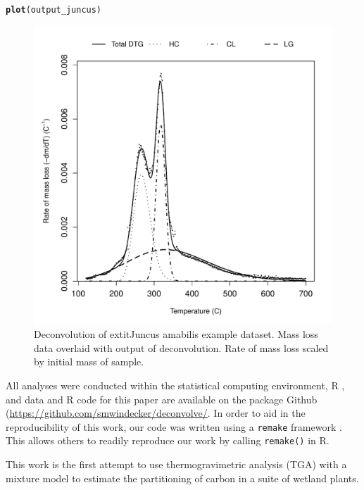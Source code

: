 \documentclass{jors}\usepackage[]{graphicx}\usepackage[]{color}
\makeatletter
\def\maxwidth{ %
  \ifdim\Gin@nat@width>\linewidth
    \linewidth
  \else
    \Gin@nat@width
  \fi
}
\newcommand{\hlstd}[1]{\textcolor[rgb]{0.345,0.345,0.345}{#1}}%
\newcommand{\hlkwd}[1]{\textcolor[rgb]{0.737,0.353,0.396}{\textbf{#1}}}%
\newenvironment{kframe}{%
 \def\at@end@of@kframe{}%
 \ifinner\ifhmode%
  \def\at@end@of@kframe{\end{minipage}}%
  \begin{minipage}{\columnwidth}%
 \fi\fi%
 \def\FrameCommand##1{\hskip\@totalleftmargin \hskip-\fboxsep
 \colorbox{shadecolor}{##1}\hskip-\fboxsep
     \hskip-\linewidth \hskip-\@totalleftmargin \hskip\columnwidth}%
 \MakeFramed {\advance\hsize-\width
   \@totalleftmargin\z@ \linewidth\hsize
   \@setminipage}}%
 {\par\unskip\endMakeFramed%
 \at@end@of@kframe}
\newenvironment{knitrout}{}{} %
\makeatother
\begin{document}
\begin{knitrout}\footnotesize
{}\color{fgcolor}\begin{kframe}
\begin{alltt}
\hlkwd{plot}\hlstd{(output_juncus)}
\end{alltt}
\end{kframe}\begin{figure}[H]
\includegraphics[width=\maxwidth]{figure/unnamed-chunk-14-1} \caption{\label{Fig:decon} Deconvolution of 	extit{Juncus amabilis} example dataset. Mass loss data overlaid with output of deconvolution. Rate of mass loss scaled by initial mass of sample.}\label{fig:unnamed-chunk-14}
\end{figure}


\end{knitrout}

All analyses were conducted within the statistical computing environment, R \citep{R}, and data and R code for this paper are available on the package Github (\url{https://github.com/smwindecker/deconvolve/}. In order to aid in the reproducibility of this work, our code was written using a \verb|remake| framework \citep{remake}. This allows others to readily reproduce our work by calling \verb|remake()| in R.


This work is the first attempt to use thermogravimetric analysis (TGA) with a mixture model to estimate the partitioning of carbon in a suite of wetland plants.
\end{document}
